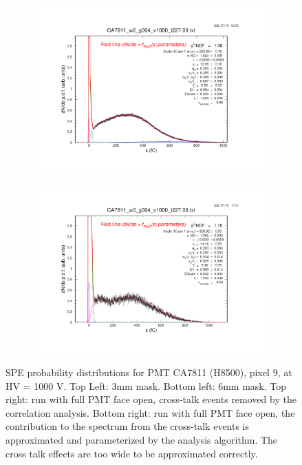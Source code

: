 \begin{figure}[t]
\begin{subfigure}[c]{0.42\linewidth}
		\centering
		\includegraphics[width=\linewidth, trim={6cm 6cm 80mm 85mm},clip]{figures/pavel_temp/CA7811_w2_g064_v1000_6mm.09.png}
		\vspace{0mm}
	\end{subfigure}%
	\begin{subfigure}[c]{0.42\linewidth}
		\centering
		\includegraphics[width=\linewidth, trim={80mm 6cm 6cm 85mm},clip]{figures/pavel_temp/CA7811_w3_g064_v1000_raw.09.png}
		\vspace{0mm}
	\end{subfigure}%
	\caption{SPE probability distributions for PMT CA7811 (H8500), pixel 9, at HV = 1000 V. Top Left: 3mm mask. Bottom left: 6mm mask. Top right: run with full PMT face open, cross-talk events removed by the correlation analysis. Bottom right: run with full PMT face open, the contribution to the spectrum from the cross-talk events is approximated and parameterized by the analysis algorithm. The cross talk effects are too wide to be approximated correctly.}
	\label{fig:CA7811_fits}
\end{figure}

